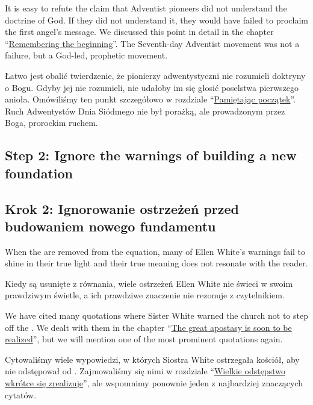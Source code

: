 It is easy to refute the claim that Adventist pioneers did not understand the doctrine of God. If they did not understand it, they would have failed to proclaim the first angel’s message. We discussed this point in detail in the chapter “\hyperref[chap:remembering-the-beginning]{Remembering the beginning}”. The Seventh-day Adventist movement was not a failure, but a God-led, prophetic movement.


Łatwo jest obalić twierdzenie, że pionierzy adwentystyczni nie rozumieli doktryny o Bogu. Gdyby jej nie rozumieli, nie udałoby im się głosić poselstwa pierwszego anioła. Omówiliśmy ten punkt szczegółowo w rozdziale “\hyperref[chap:remembering-the-beginning]{Pamiętając początek}”. Ruch Adwentystów Dnia Siódmego nie był porażką, ale prowadzonym przez Boga, prorockim ruchem.


\subsection*{Step 2: Ignore the warnings of building a new foundation}


\subsection*{Krok 2: Ignorowanie ostrzeżeń przed budowaniem nowego fundamentu}


When the  are removed from the equation, many of Ellen White’s warnings fail to shine in their true light and their true meaning does not resonate with the reader.


Kiedy  są usunięte z równania, wiele ostrzeżeń Ellen White nie świeci w swoim prawdziwym świetle, a ich prawdziwe znaczenie nie rezonuje z czytelnikiem.


We have cited many quotations where Sister White warned the church not to step off the . We dealt with them in the chapter “\hyperref[chap:apostasy]{The great apostasy is soon to be realized}”, but we will mention one of the most prominent quotations again.


Cytowaliśmy wiele wypowiedzi, w których Siostra White ostrzegała kościół, aby nie odstępował od . Zajmowaliśmy się nimi w rozdziale “\hyperref[chap:apostasy]{Wielkie odstępstwo wkrótce się zrealizuje}”, ale wspomnimy ponownie jeden z najbardziej znaczących cytatów.



